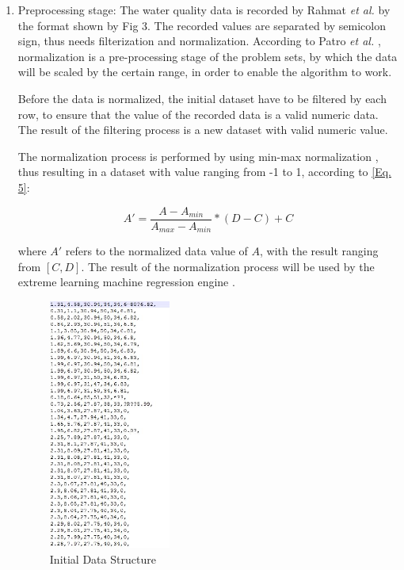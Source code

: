 \documentclass[journal,comsoc]{IEEEtran}
\let\MYoriglatexcaption\caption
\renewcommand{\caption}[2][\relax]{\MYoriglatexcaption[#2]{#2}}
\begin{document}
\begin{enumerate}

\item Preprocessing stage: The water quality data is recorded by Rahmat {\it et al.} \cite{Rahmat16} by the format shown by Fig 3. The recorded values are separated by semicolon sign, thus needs filterization and normalization. According to Patro {\it et al.} \cite{Patro15} , normalization is a pre-processing stage of the problem sets, by which the data will be scaled by the certain range, in order to enable the algorithm to work.

Before the data is normalized, the initial dataset have to be filtered by each row, to ensure that the value of the recorded data is a valid numeric data. The result of the filtering process is a new dataset with valid numeric value.

The normalization process is performed by using min-max normalization \cite{Patro15} , thus resulting in a dataset with value ranging from -1 to 1, according to \eqref{Eq. 5}:

\begin{equation}
A' = \frac{A - A_{min}}{A_{max} - A_{min}} * (D - C) + C\label{Eq. 5}
\end{equation}

where $A'$ refers to the normalized data value of $A$, with the result ranging from $[C, D]$. The result of the normalization process will be used by the extreme learning machine regression engine \cite{Zhu13}.


\begin{figure}[!th]
\centering
\includegraphics[width=4cm]{fig-3.jpg}
\caption{Initial Data Structure \cite{Rahmat16}}
\label{fig3}
\end{figure}


\end{enumerate}
\end{document}
